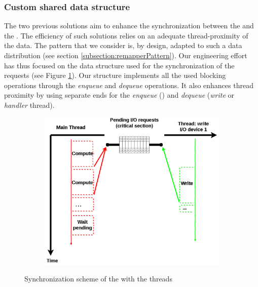 		\subsubsection{Custom shared data structure}\label{subsubsection:customDatastructure}
			The two previous solutions aim to enhance the synchronization between the \notationaioComputeThread\space and the \notationaioWriteThread.   The efficiency of such solutions relies on an adequate thread-proximity of the data.   The pattern that we consider is, by design, adapted to such a data distribution (see section \ref{subsection:remapperPattern}).   Our engineering effort has thus focused on the data structure used for the synchronization of the \notationaio\space requests (see Figure \ref{fig:synchronization}).   Our structure implements all the used blocking operations through the \emph{enqueue} and \emph{dequeue} operations.   It also enhances thread proximity by using separate ends for the \emph{enqueue} (\notationaioComputeThread) and \emph{dequeue} (\emph{write} or \emph{handler} thread).\\

				\begin{figure}[!h]
					\centering
					\begin{subfigure}[b]{0.65\textwidth}
						\centering
						\includegraphics[width=\textwidth]{charts/internshipJulich_AIO-synchronization.png}
					\end{subfigure}
					\caption{Synchronization scheme of the \notationaioComputeThread\space with the \notationaioShort\space threads}
					\label{fig:synchronization}
				\end{figure}

